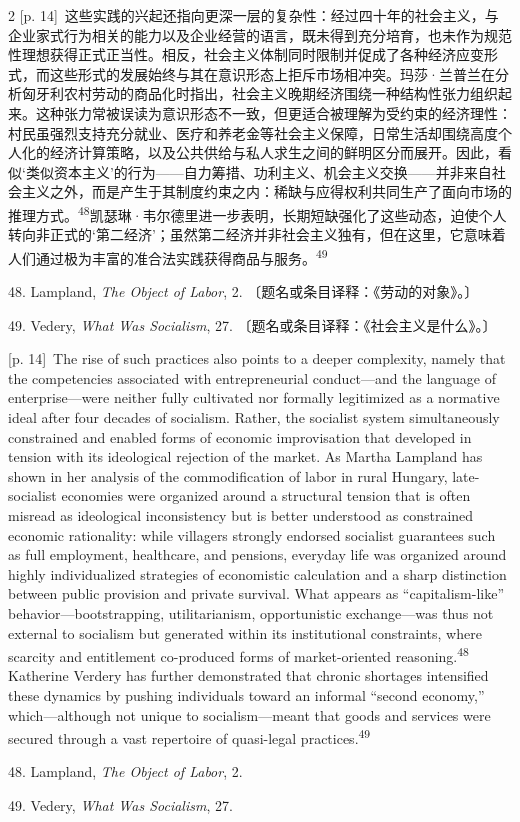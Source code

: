 \documentclass[10pt,a4paper]{article}
\begin{document}
\begin{paracol}{2}
{\scriptsize\color{gray} [p. 14]}\ 这些实践的兴起还指向更深一层的复杂性：经过四十年的社会主义，与企业家式行为相关的能力以及企业经营的语言，既未得到充分培育，也未作为规范性理想获得正式正当性。相反，社会主义体制同时限制并促成了各种经济应变形式，而这些形式的发展始终与其在意识形态上拒斥市场相冲突。玛莎·兰普兰在分析匈牙利农村劳动的商品化时指出，社会主义晚期经济围绕一种结构性张力组织起来。这种张力常被误读为意识形态不一致，但更适合被理解为受约束的经济理性：村民虽强烈支持充分就业、医疗和养老金等社会主义保障，日常生活却围绕高度个人化的经济计算策略，以及公共供给与私人求生之间的鲜明区分而展开。因此，看似‘类似资本主义’的行为——自力筹措、功利主义、机会主义交换——并非来自社会主义之外，而是产生于其制度约束之内：稀缺与应得权利共同生产了面向市场的推理方\mbox{式。\textsuperscript{48}}凯瑟琳·韦尔德里进一步表明，长期短缺强化了这些动态，迫使个人转向非正式的‘第二经济’；虽然第二经济并非社会主义独有，但在这里，它意味着人们通过极为丰富的准合法实践获得商品与服\mbox{务。\textsuperscript{49}}\par{\small 48. Lampland, \textit{The Object of Labor}, 2. 〔题名或条目译释：《劳动的对象》。〕\par}{\small 49. Vedery, \textit{What Was Socialism}, 27. 〔题名或条目译释：《社会主义是什么》。〕\par}
\switchcolumn
{\scriptsize\color{gray} [p. 14]}\ The rise of such practices also points to a deeper complexity, namely that the competencies associated with entrepreneurial conduct—and the language of enterprise—were neither fully cultivated nor formally legitimized as a normative ideal after four decades of socialism. Rather, the socialist system simultaneously constrained and enabled forms of economic improvisation that developed in tension with its ideological rejection of the market. As Martha Lampland has shown in her analysis of the commodification of labor in rural Hungary, late-socialist economies were organized around a structural tension that is often misread as ideological inconsistency but is better understood as constrained economic rationality: while villagers strongly endorsed socialist guarantees such as full employment, healthcare, and pensions, everyday life was organized around highly individualized strategies of economistic calculation and a sharp distinction between public provision and private survival. What appears as “capitalism-like” behavior—bootstrapping, utilitarianism, opportunistic exchange—was thus not external to socialism but generated within its institutional constraints, where scarcity and entitlement co-produced forms of market-oriented reasoning.\nobreak\textsuperscript{48} Katherine Verdery has further demonstrated that chronic shortages intensified these dynamics by pushing individuals toward an informal “second economy,” which—although not unique to socialism—meant that goods and services were secured through a vast repertoire of quasi-legal practices.\nobreak\textsuperscript{49}\par{\small 48. Lampland, \textit{The Object of Labor}, 2.\par}{\small 49. Vedery, \textit{What Was Socialism}, 27.\par}

\end{paracol}
\end{document}
